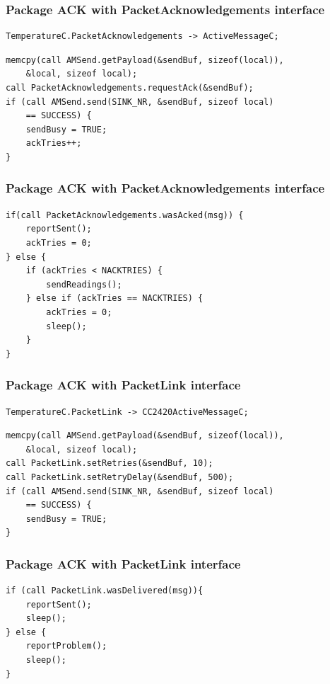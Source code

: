 \begin{frame}[fragile]
\frametitle{Package ACK with PacketAcknowledgements interface}
\begin{lstlisting}[caption={TemperatureAppC.nc}]
 TemperatureC.PacketAcknowledgements -> ActiveMessageC;
\end{lstlisting}


\begin{lstlisting}[caption={TemperatureC.nc $\rightarrow$ sendReadings()}]
memcpy(call AMSend.getPayload(&sendBuf, sizeof(local)),
    &local, sizeof local);
call PacketAcknowledgements.requestAck(&sendBuf);
if (call AMSend.send(SINK_NR, &sendBuf, sizeof local)
    == SUCCESS) {
    sendBusy = TRUE;
    ackTries++;
}
\end{lstlisting}

\end{frame}

\begin{frame}[fragile]
\frametitle{Package ACK with PacketAcknowledgements interface}

\begin{lstlisting}[caption={TemperatureC.nc $\rightarrow$ AMSend.sendDone()}]
if(call PacketAcknowledgements.wasAcked(msg)) {
    reportSent();
    ackTries = 0;
} else {
    if (ackTries < NACKTRIES) {
        sendReadings();
    } else if (ackTries == NACKTRIES) {
        ackTries = 0;
        sleep();
    }
}
\end{lstlisting}

\end{frame}

\begin{frame}[fragile]
\frametitle{Package ACK with PacketLink interface}
\begin{lstlisting}[caption={TemperatureAppC.nc}]
TemperatureC.PacketLink -> CC2420ActiveMessageC;
\end{lstlisting}

\begin{lstlisting}[caption={TemperatureC.nc $\rightarrow$ sendReadings()}]
memcpy(call AMSend.getPayload(&sendBuf, sizeof(local)),
    &local, sizeof local);
call PacketLink.setRetries(&sendBuf, 10);
call PacketLink.setRetryDelay(&sendBuf, 500);
if (call AMSend.send(SINK_NR, &sendBuf, sizeof local)
    == SUCCESS) {
    sendBusy = TRUE;
}
\end{lstlisting}

\end{frame}

\begin{frame}[fragile]
\frametitle{Package ACK with PacketLink interface}

\begin{lstlisting}[caption={TemperatureC.nc $\rightarrow$ AMSend.sendDone()}]
if (call PacketLink.wasDelivered(msg)){
    reportSent();
    sleep();
} else {
    reportProblem();
    sleep();
}
\end{lstlisting}

\end{frame}

